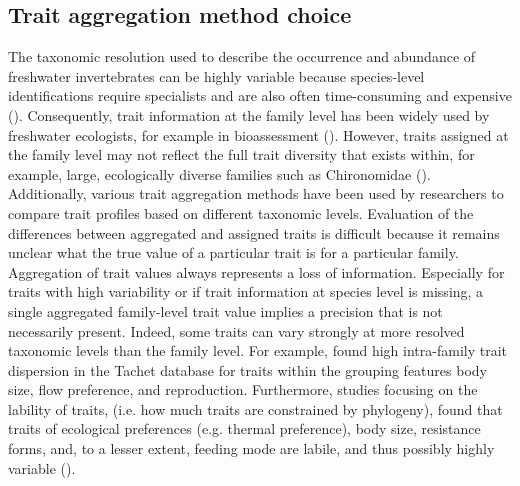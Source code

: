 \documentclass[12pt]{article}
\begin{document}

\subsection*{Trait aggregation method choice}

The taxonomic resolution used to describe the occurrence and abundance of freshwater invertebrates can be highly variable because species-level identifications require specialists and are also often time-consuming and expensive (\cite{marshall_taxonomic_2006, resh_which_2008}). Consequently, trait information at the family level has been widely used by freshwater ecologists, for example in bioassessment (\cite{beketov_spear_2009}). However, traits assigned at the family level may not reflect the full trait diversity that exists within, for example, large, ecologically diverse families such as Chironomidae (\cite{serra_synthesising_2016}). Additionally, various trait aggregation methods have been used by researchers to compare trait profiles based on different taxonomic levels. Evaluation of the differences between aggregated and assigned traits is difficult because it remains unclear what the true value of a particular trait is for a particular family. Aggregation of trait values always represents a loss of information. Especially for traits with high variability or if trait information at species level is missing, a single aggregated family-level trait value implies a precision that is not necessarily present. Indeed, some traits can vary strongly at more resolved taxonomic levels than the family level. For example, \citet{monaghan_improving_2013} found high intra-family trait dispersion in the Tachet database for traits within the grouping features body size, flow preference, and reproduction. Furthermore, studies focusing on the lability of traits, (i.e. how much traits are constrained by phylogeny), found that traits of ecological preferences (e.g. thermal preference), body size, resistance forms, and, to a lesser extent, feeding mode are labile, and thus possibly highly variable (\cite{poff_functional_2006, wilkes_traitbased_2020}). 
\end{document}
